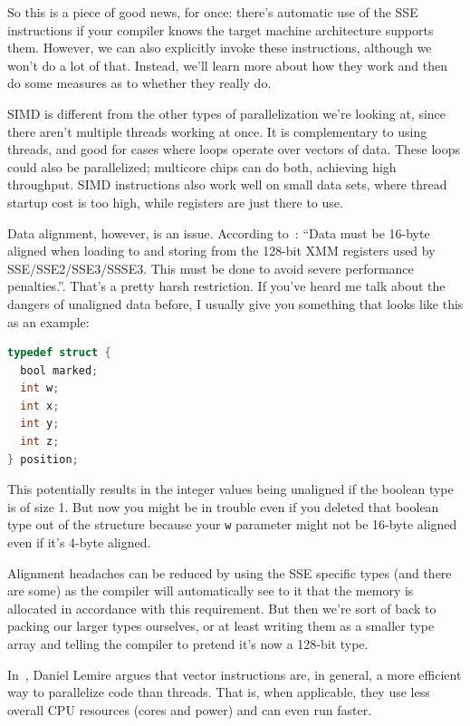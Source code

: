 \documentclass[a4paper]{report}
\begin{document}
So this is a piece of good news, for once: there's automatic use of the SSE instructions if your compiler knows the target machine architecture supports them. However, we can also explicitly invoke these instructions, although we won't do a lot of that. Instead, we'll learn more about how they work and then do some measures as to whether they really do. 

SIMD is different from the other types of parallelization we're
looking at, since there aren't multiple threads working at once.
It is complementary to using threads, and good for cases
where loops operate over vectors of data. These loops could also be
parallelized; multicore chips can do both, achieving high throughput.
SIMD instructions also work well on small data sets, where thread startup
cost is too high, while registers are just there to use.

Data alignment, however, is an issue. According to~\cite{sse}: ``Data must be 16-byte aligned when loading to and storing from the 128-bit XMM registers used by SSE/SSE2/SSE3/SSSE3. This must be done to avoid severe performance penalties.''. That's a pretty harsh restriction. If you've heard me talk about the dangers of unaligned data before, I usually give you something that looks like this as an example:

\begin{lstlisting}[language=C]
typedef struct {
  bool marked;
  int w;
  int x;
  int y;
  int z;
} position;
\end{lstlisting}

This potentially results in the integer values being unaligned if the boolean type is of size 1. But now you might be in trouble even if you deleted that boolean type out of the structure because your \texttt{w} parameter might not be 16-byte aligned even if it's 4-byte aligned. 

Alignment headaches can be reduced by using the SSE specific types (and there are some) as the compiler will automatically see to it that the memory is allocated in accordance with this requirement. But then we're sort of back to packing our larger types ourselves, or at least writing them as a smaller type array and telling the compiler to pretend it's now a 128-bit type.

In~\cite{lemire18:_multic_simd}, Daniel Lemire argues that vector
instructions are, in general, a more efficient way to parallelize code
than threads. That is, when applicable, they use less overall CPU
resources (cores and power) and can even run faster.
\end{document}
